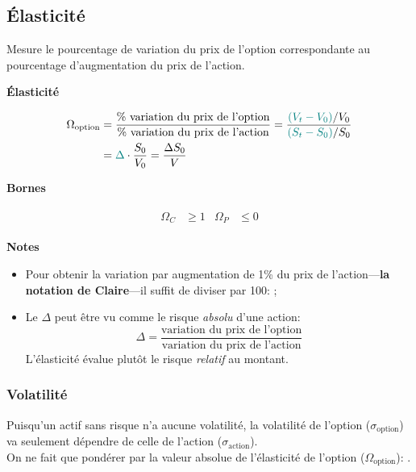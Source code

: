 \documentclass[10pt, french]{article}
\begin{document}
\begin{multicols*}{2}
\columnbreak

\subsection{Élasticité}


\begin{definitionNOHFILL}[Élasticité $\Omega	=	\frac{\Delta S_{0}}{V}$]
Mesure le pourcentage de variation du prix de l'option correspondante au pourcentage d'augmentation du prix de l'action.

\tcbline

\begin{center}
	\textbf{Élasticité}
\end{center}
\begin{align*}
		\Omega_{\text{option}}
		&=	\frac{\text{\% variation du prix de l'option}}{\text{\% variation du prix de l'action}}	
		=	\frac{{\color{teal}(V_{t} - V_{0})}/V_{0}}{{\color{teal}(S_{t} - S_{0})}/S_{0}}	\\
		&=	{\color{teal}\Delta} \cdot \frac{S_{0}}{V_{0}}
		=	\frac{\Delta S_{0}}{V}
\end{align*}

\begin{center}
	\textbf{Bornes}
\end{center}
\begin{gather}
\begin{align*}
	\Omega_{C}	&\ge		1	&
	\Omega_{P}	&\le		0
\end{align*}
\end{gather}

\tcbline

\begin{center}
	\textbf{Notes}
\end{center}
\begin{itemize}[leftmargin = *]
	\item	Pour obtenir la variation par augmentation de 1\% du prix de l'action---\textbf{la notation de Claire}---il suffit de diviser par 100: ;
	\item	Le $\Delta$ peut être vu comme le risque \textit{absolu} d'une action: \[\Delta = \frac{\text{variation du prix de l'option}}{\text{variation du prix de l'action}}\]
			L'élasticité évalue plutôt le risque \textit{relatif} au montant.
\end{itemize}
\end{definitionNOHFILL}

\subsubsection*{Volatilité}
Puisqu'un actif sans risque n'a aucune volatilité, la volatilité de l'option ($\sigma_{\text{option}}$) va seulement dépendre de celle de l'action ($\sigma_{\text{action}}$).\\
On ne fait que pondérer par la valeur absolue de l'élasticité de l'option ($\Omega_{\text{option}}$): .
%	


\end{multicols*}
\end{document}
